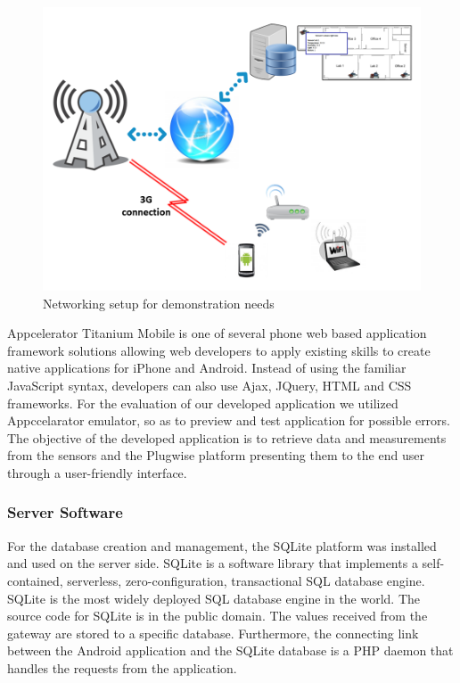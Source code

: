 \documentclass[conference]{IEEEtran}
\begin{document}
\begin{figure}[!t]
\begin{center}
\centering
\includegraphics[scale=0.35]{images/Demo_Setup.png}
\caption{Networking setup for demonstration needs}
\label{fig:network}
\end{center}
\vspace{-0.8cm}
\end{figure}

Appcelerator Titanium Mobile is one of several phone web based application framework solutions allowing web developers to apply existing skills to create native applications for iPhone and Android.
Instead of using the familiar JavaScript syntax, developers can also use Ajax, JQuery, HTML and CSS frameworks. 
For the evaluation of our developed application we utilized Appccelarator emulator, so as to preview and test application for possible errors.
The objective of the developed application is to retrieve data and measurements from the sensors and the Plugwise platform presenting them to the end user through a user-friendly interface.

\subsubsection{Server Software}


For the database creation and management, the SQLite platform was installed and used on the server side.
SQLite is a software library that implements a self-contained, serverless, zero-configuration, transactional SQL database engine. 
SQLite is the most widely deployed SQL database engine in the world. 
The source code for SQLite is in the public domain. 
The values received from the gateway are stored to a specific database. 
Furthermore, the connecting link between the Android application and the SQLite database is a PHP daemon that handles the requests from the application.
\end{document}

